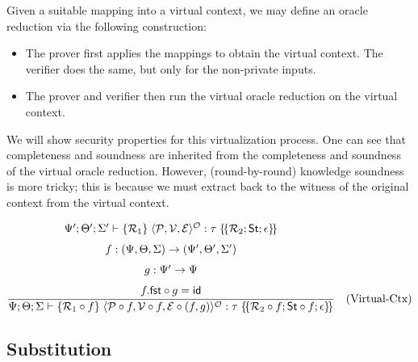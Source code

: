\begin{definition}
    \label{def:virtual_oracle_reduction}
    Given a suitable mapping into a virtual context, we may define an oracle reduction via the following construction:
    \begin{itemize}
        \item The prover first applies the mappings to obtain the virtual context. The verifier does the same, but only for the non-private inputs.
        \item The prover and verifier then run the virtual oracle reduction on the virtual context.
    \end{itemize}
\end{definition}

We will show security properties for this virtualization process. One can see that completeness and soundness are inherited from the completeness and soundness of the virtual oracle reduction. However, (round-by-round) knowledge soundness is more tricky; this is because we must extract back to the witness of the original context from the virtual context.


\[
\frac{%
  \begin{array}{c}
    \Psi'; \Theta'; \Sigma' \vdash \{\mathcal{R}_1\} \; \langle\mathcal{P}, \mathcal{V}, \mathcal{E}\rangle^{\mathcal{O}} : \tau \; \{\!\{\mathcal{R}_2; \mathsf{St}; \epsilon\}\!\} \\[1.5ex]
    f : (\Psi, \Theta, \Sigma) \to (\Psi', \Theta', \Sigma') \\[1.5ex]
    g : \Psi' \to \Psi \\[1.5ex]
    f.\mathsf{fst} \circ g = \mathsf{id}
  \end{array}%
}{%
  \Psi; \Theta; \Sigma \vdash \{\mathcal{R}_1 \circ f\} \; \langle\mathcal{P} \circ f, \mathcal{V} \circ f, \mathcal{E} \circ (f, g)\rangle^{\mathcal{O}} : \tau \; \{\!\{\mathcal{R}_2 \circ f; \mathsf{St} \circ f; \epsilon\}\!\}
} \quad \text{(Virtual-Ctx)}
\]

\subsection{Substitution}

